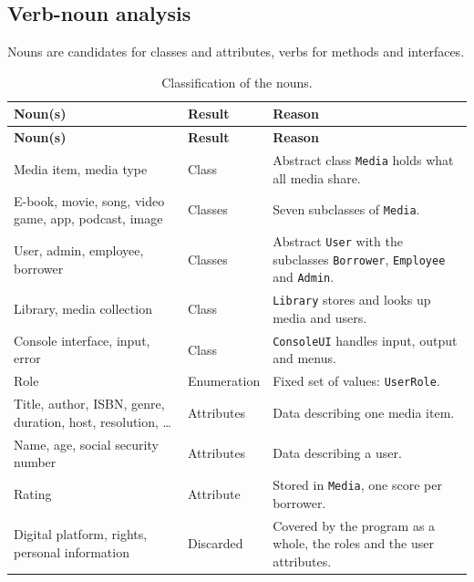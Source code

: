 \subsection{Verb-noun analysis}

Nouns are candidates for classes and attributes, verbs for methods and interfaces.

\small
\renewcommand{\arraystretch}{1.2}
\begin{longtable}{|>{\raggedright\arraybackslash}p{}|>{\raggedright\arraybackslash}p{}|>{\raggedright\arraybackslash}p{}|}
\caption{Classification of the nouns.}\\
\hline
\textbf{Noun(s)} & \textbf{Result} & \textbf{Reason}\\ \hline
\endfirsthead
\hline
\textbf{Noun(s)} & \textbf{Result} & \textbf{Reason}\\ \hline
\endhead
Media item, media type & Class & Abstract class \texttt{Media} holds what all media share.\\ \hline
E-book, movie, song, video game, app, podcast, image & Classes & Seven subclasses of \texttt{Media}.\\ \hline
User, admin, employee, borrower & Classes & Abstract \texttt{User} with the subclasses \texttt{Borrower}, \texttt{Employee} and \texttt{Admin}.\\ \hline
Library, media collection & Class & \texttt{Library} stores and looks up media and users.\\ \hline
Console interface, input, error & Class & \texttt{ConsoleUI} handles input, output and menus.\\ \hline
Role & Enumeration & Fixed set of values: \texttt{UserRole}.\\ \hline
Title, author, ISBN, genre, duration, host, resolution, \ldots & Attributes & Data describing one media item.\\ \hline
Name, age, social security number & Attributes & Data describing a user.\\ \hline
Rating & Attribute & Stored in \texttt{Media}, one score per borrower.\\ \hline
Digital platform, rights, personal information & Discarded & Covered by the program as a whole, the roles and the user attributes.\\ \hline
\end{longtable}

